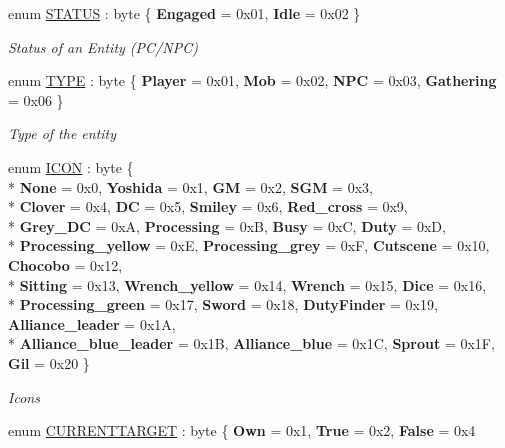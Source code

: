 \begin{DoxyCompactItemize}
enum \hyperlink{namespaceffxivlib_a856915176aeab1f9b643c0243cb008ee}{S\-T\-A\-T\-U\-S} \-: byte \{ {\bfseries Engaged} = 0x01, 
{\bfseries Idle} = 0x02
 \}
\begin{DoxyCompactList}\small\item\em Status of an Entity (P\-C/\-N\-P\-C) \end{DoxyCompactList}\item 
enum \hyperlink{namespaceffxivlib_aaa4e86d1ea6dbc1661147e6616256e68}{T\-Y\-P\-E} \-: byte \{ {\bfseries Player} = 0x01, 
{\bfseries Mob} = 0x02, 
{\bfseries N\-P\-C} = 0x03, 
{\bfseries Gathering} = 0x06
 \}
\begin{DoxyCompactList}\small\item\em Type of the entity \end{DoxyCompactList}\item 
enum \hyperlink{namespaceffxivlib_a3a6b3a65a3fc9ba42586b2ccc07e4aac}{I\-C\-O\-N} \-: byte \{ \\*
{\bfseries None} = 0x0, 
{\bfseries Yoshida} = 0x1, 
{\bfseries G\-M} = 0x2, 
{\bfseries S\-G\-M} = 0x3, 
\\*
{\bfseries Clover} = 0x4, 
{\bfseries D\-C} = 0x5, 
{\bfseries Smiley} = 0x6, 
{\bfseries Red\-\_\-cross} = 0x9, 
\\*
{\bfseries Grey\-\_\-\-D\-C} = 0x\-A, 
{\bfseries Processing} = 0x\-B, 
{\bfseries Busy} = 0x\-C, 
{\bfseries Duty} = 0x\-D, 
\\*
{\bfseries Processing\-\_\-yellow} = 0x\-E, 
{\bfseries Processing\-\_\-grey} = 0x\-F, 
{\bfseries Cutscene} = 0x10, 
{\bfseries Chocobo} = 0x12, 
\\*
{\bfseries Sitting} = 0x13, 
{\bfseries Wrench\-\_\-yellow} = 0x14, 
{\bfseries Wrench} = 0x15, 
{\bfseries Dice} = 0x16, 
\\*
{\bfseries Processing\-\_\-green} = 0x17, 
{\bfseries Sword} = 0x18, 
{\bfseries Duty\-Finder} = 0x19, 
{\bfseries Alliance\-\_\-leader} = 0x1\-A, 
\\*
{\bfseries Alliance\-\_\-blue\-\_\-leader} = 0x1\-B, 
{\bfseries Alliance\-\_\-blue} = 0x1\-C, 
{\bfseries Sprout} = 0x1\-F, 
{\bfseries Gil} = 0x20
 \}
\begin{DoxyCompactList}\small\item\em Icons \end{DoxyCompactList}\item 
enum \hyperlink{namespaceffxivlib_a027fd426531e3a42243f5c2b946dde31}{C\-U\-R\-R\-E\-N\-T\-T\-A\-R\-G\-E\-T} \-: byte \{ {\bfseries Own} = 0x1, 
{\bfseries True} = 0x2, 
{\bfseries False} = 0x4

\end{DoxyCompactItemize}
